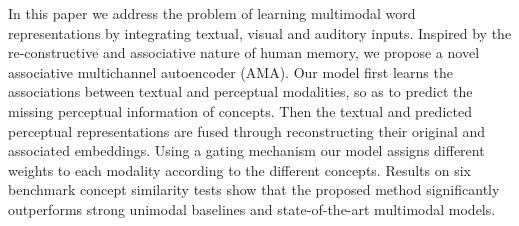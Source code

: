 In this paper we address the problem of learning multimodal word representations by integrating textual, visual and auditory inputs. Inspired by the re-constructive and associative nature of human memory, we propose a novel associative multichannel autoencoder (AMA). Our model first learns the associations between textual and perceptual modalities, so as to predict the missing perceptual information of concepts. Then the textual and predicted perceptual representations are fused through reconstructing their original and associated embeddings. Using a gating mechanism our model assigns different weights to each modality according to the different concepts. Results on six benchmark concept similarity tests show that the proposed method significantly outperforms strong unimodal baselines and state-of-the-art multimodal models.
